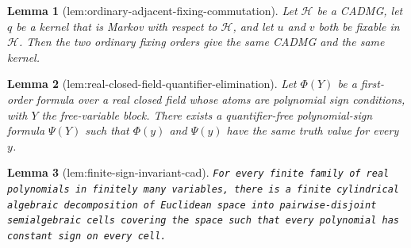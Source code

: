 \documentclass{article}
\newtheorem{lemma}{Lemma}
\begin{document}
\begin{lemma}[lem:ordinary-adjacent-fixing-commutation]\label{lem:ordinary-adjacent-fixing-commutation}
Let \(\mathcal H\) be a CADMG, let \(q\) be a kernel that is Markov with respect to \(\mathcal H\), and let \(u\) and \(v\) both be fixable in \(\mathcal H\). Then the two ordinary fixing orders give the same CADMG and the same kernel.
\end{lemma}

\begin{lemma}[lem:real-closed-field-quantifier-elimination]\label{lem:real-closed-field-quantifier-elimination}
Let \(\Phi(Y)\) be a first-order formula over a real closed field whose atoms are polynomial sign conditions, with \(Y\) the free-variable block. There exists a quantifier-free polynomial-sign formula \(\Psi(Y)\) such that \(\Phi(y)\) and \(\Psi(y)\) have the same truth value for every \(y\).
\end{lemma}

\begin{lemma}[lem:finite-sign-invariant-cad]\label{lem:finite-sign-invariant-cad}
\texttt{For every finite family of real polynomials in finitely many variables,\allowbreak{} there is a finite cylindrical algebraic decomposition of Euclidean space into pairwise-\allowbreak{}disjoint semialgebraic cells covering the space such that every polynomial has constant sign on every cell.}
\end{lemma}
\end{document}
